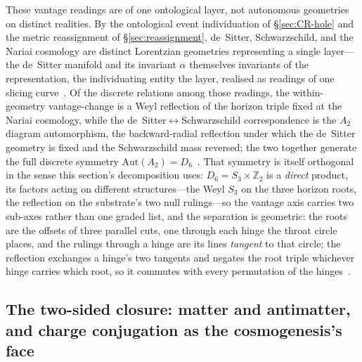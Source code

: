 \documentclass[11pt,a4paper]{article}
\theoremstyle{plain}
\theoremstyle{definition}
\theoremstyle{remark}
\begin{document}
These vantage readings are of one ontological layer, not autonomous geometries on distinct realities. By the ontological event individuation of \S\ref{sec:CR-hole} and the metric reassignment of \S\ref{sec:reassignment}, de~Sitter, Schwarzschild, and the Nariai cosmology are distinct Lorentzian geometries representing a single layer---the de~Sitter manifold and its invariant $\alpha$ themselves invariants of the representation, the individuating entity the layer, realised as readings of one slicing curve~\cite{JanzenSlicing}. Of the discrete relations among those readings, the within-geometry vantage-change is a Weyl reflection of the horizon triple fixed at the Nariai cosmology, while the de~Sitter$\leftrightarrow$Schwarzschild correspondence is the $A_2$ diagram automorphism, the backward-radial reflection under which the de~Sitter geometry is fixed and the Schwarzschild mass reversed; the two together generate the full discrete symmetry $\mathrm{Aut}(A_2)=D_6$~\cite{JanzenGroupoid,JanzenAlgebroid}. That symmetry is itself orthogonal in the sense this section's decomposition uses: $D_6=S_3\times\mathbb{Z}_2$ is a \emph{direct} product, its factors acting on different structures---the Weyl $S_3$ on the three horizon roots, the reflection on the substrate's two null rulings---so the vantage axis carries two sub-axes rather than one graded list, and the separation is geometric: the roots are the offsets of three parallel cuts, one through each hinge the throat circle places, and the rulings through a hinge are its lines \emph{tangent} to that circle; the reflection exchanges a hinge's two tangents and negates the root triple whichever hinge carries which root, so it commutes with every permutation of the hinges~\cite{JanzenGeometricCore,JanzenMatter}.

\subsection{The two-sided closure: matter and antimatter, and charge conjugation as the cosmogenesis's face}\label{sec:two-sided-closure}
\end{document}
